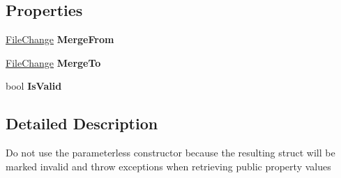 \subsection*{Properties}
\begin{DoxyCompactItemize}
\item 
\hypertarget{struct_cloud_api_public_1_1_model_1_1_file_change_merge_ae1e6fa957daa5680741c7f9bc136aff6}{\hyperlink{class_cloud_api_public_1_1_model_1_1_file_change}{File\-Change} {\bfseries Merge\-From}}\label{struct_cloud_api_public_1_1_model_1_1_file_change_merge_ae1e6fa957daa5680741c7f9bc136aff6}

\item 
\hypertarget{struct_cloud_api_public_1_1_model_1_1_file_change_merge_ae068338443b73adfa14ddf9c7c11b5ba}{\hyperlink{class_cloud_api_public_1_1_model_1_1_file_change}{File\-Change} {\bfseries Merge\-To}}\label{struct_cloud_api_public_1_1_model_1_1_file_change_merge_ae068338443b73adfa14ddf9c7c11b5ba}

\item 
\hypertarget{struct_cloud_api_public_1_1_model_1_1_file_change_merge_a2532bffa04b1f680998f65a67efca6e4}{bool {\bfseries Is\-Valid}}\label{struct_cloud_api_public_1_1_model_1_1_file_change_merge_a2532bffa04b1f680998f65a67efca6e4}

\end{DoxyCompactItemize}


\subsection{Detailed Description}
Do not use the parameterless constructor because the resulting struct will be marked invalid and throw exceptions when retrieving public property values 



